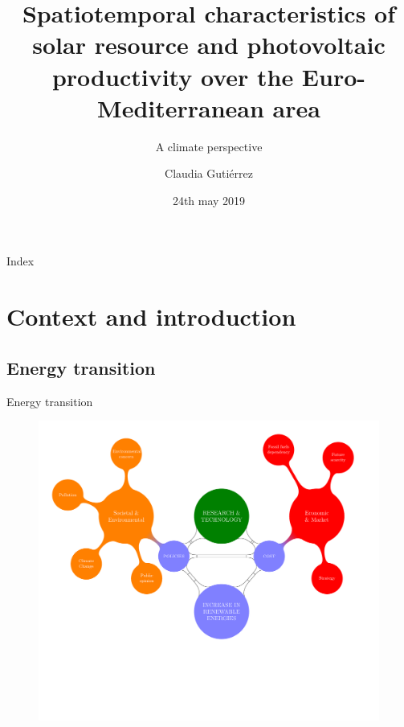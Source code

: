 \documentclass{beamer}%
\title{Spatiotemporal characteristics of solar resource and photovoltaic productivity over the Euro-Mediterranean area}
\subtitle{A climate perspective}
\date{24th may 2019}
\author{Claudia Guti\'errez}
\institute[ICAM] %
 {
   \inst{1}
   Facultad de Ciencias Ambientales y Bioqu\'imica\\
   Universidad de Castilla-La Mancha, Toledo, Spain
}
\begin{document}
\maketitle

\begin{frame}[plain]{Index}                                                                                              \tableofcontents                                                                                                       %
\end{frame}

\section{Context and introduction}

\subsection{Energy transition}


\begin{frame}[fragile]{Energy transition}
\begin{figure}
\centering\includegraphics[scale=0.42]{diagram.pdf}
\end{figure} 
\end{frame}
\end{document}
